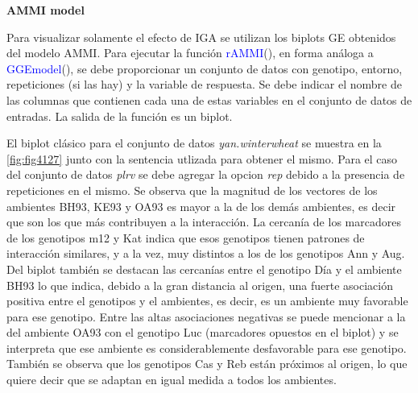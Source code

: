 \textbf{AMMI model}


Para visualizar solamente el efecto de IGA se utilizan los biplots GE obtenidos del modelo AMMI. Para ejecutar la función \textcolor{blue}{rAMMI}(), en forma análoga a \textcolor{blue}{GGEmodel}(), se debe proporcionar un conjunto de datos con genotipo, entorno, repeticiones (si las hay) y la variable de respuesta. Se debe indicar el nombre de las columnas que contienen cada una de estas variables en el conjunto de datos de entradas. La salida de la función es un biplot.

El biplot clásico para el conjunto de datos \emph{yan.winterwheat} se muestra en la \ref{fig:fig4127} junto con la sentencia utlizada para obtener el mismo. Para el caso del conjunto de datos \emph{plrv} se debe agregar la opcion \emph{rep} debido a la presencia de repeticiones en el mismo.
Se observa que la magnitud de los vectores de los ambientes BH93, KE93 y OA93 es mayor a la de los demás ambientes, es decir que son los que más contribuyen a la interacción. La cercanía de los marcadores de los genotipos m12 y Kat indica que esos genotipos tienen patrones de interacción similares, y a la vez, muy distintos a los de los genotipos Ann y Aug. Del biplot también se destacan las cercanías entre el genotipo Día y el ambiente BH93 lo que indica, debido a la gran distancia al origen, una fuerte asociación positiva entre el genotipos y el ambientes, es decir, es un ambiente muy favorable para ese genotipo.
Entre las altas asociaciones negativas se puede mencionar a la del ambiente OA93 con el genotipo Luc (marcadores opuestos en el biplot) y se interpreta que ese ambiente es considerablemente desfavorable para ese genotipo. También se observa que los genotipos Cas y Reb están próximos al origen, lo que quiere decir que se adaptan en igual medida a todos los ambientes.


